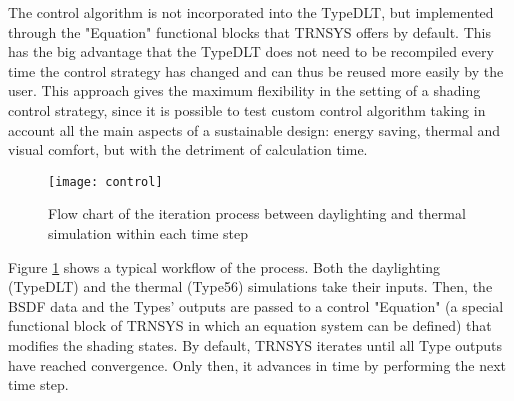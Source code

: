 The control algorithm is not incorporated into the TypeDLT, but implemented through the "Equation" functional blocks that TRNSYS offers by default. This has the big advantage that the TypeDLT does not need to be recompiled every time the control strategy has changed and can thus be reused more easily by the user.
This approach gives the maximum flexibility in the setting of a shading control strategy, since it is possible to test custom control algorithm taking in account all the main aspects of a sustainable design: energy saving, thermal and visual comfort, but with the detriment of calculation time.

\begin{figure}[h]
\centering
\texttt{[image: control]}
\caption{\label{img2:flow} Flow chart of the iteration process between daylighting and thermal simulation within each time step}
\end{figure}

Figure \ref{img2:flow} shows a typical workflow of the process. Both the daylighting (TypeDLT) and the thermal (Type56) simulations take their inputs. Then, the BSDF data and the Types' outputs are passed to a control "Equation" (a special functional block of TRNSYS in which an equation system can be defined) that modifies the shading states. By default, TRNSYS iterates until all Type outputs have reached convergence. Only then, it advances in time by performing the next time step.

